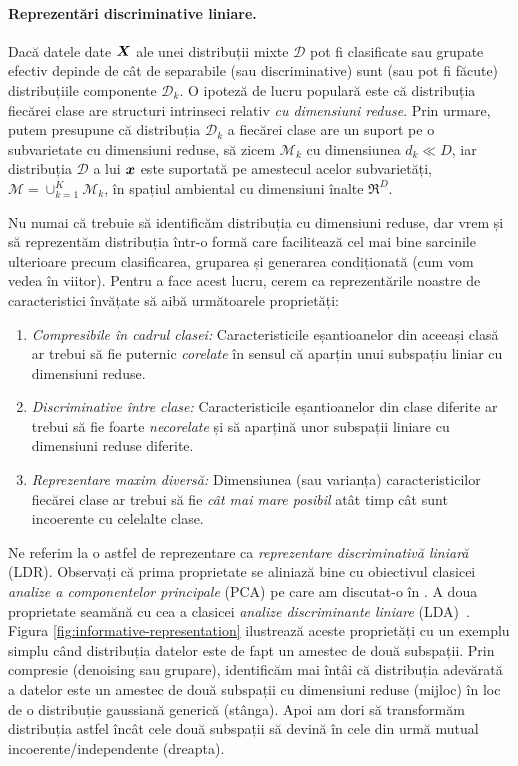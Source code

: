 \documentclass[../../book-main_ro.tex]{subfiles}
\begin{document}
\paragraph{Reprezentări discriminative liniare.}
Dacă datele date $\bm{X}$ ale unei distribuții mixte $\mathcal{D}$ pot fi clasificate sau grupate efectiv depinde de cât de separabile (sau discriminative) sunt (sau pot fi făcute) distribuțiile componente $\mathcal{D}_k$. O ipoteză de lucru populară este că distribuția fiecărei clase are structuri intrinseci relativ {\em cu dimensiuni reduse}. Prin urmare, putem presupune că distribuția $\mathcal{D}_k$ a fiecărei clase are un suport pe o subvarietate cu dimensiuni reduse, să zicem $\mathcal{M}_k$ cu dimensiunea $d_k \ll D$, iar distribuția $\mathcal D$ a lui $\bm{x}$ este suportată pe amestecul acelor subvarietăți, $\mathcal M = \cup_{k=1}^K \mathcal{M}_k$, în spațiul ambiental cu dimensiuni înalte $\Re^D$.

Nu numai că trebuie să identificăm distribuția cu dimensiuni reduse, dar vrem și să reprezentăm distribuția într-o formă care facilitează cel mai bine sarcinile ulterioare precum clasificarea, gruparea și generarea condiționată (cum vom vedea în viitor). Pentru a face acest lucru, cerem ca reprezentările noastre de caracteristici învățate să aibă următoarele proprietăți:
\begin{enumerate}
	\item {\em Compresibile în cadrul clasei:} Caracteristicile eșantioanelor din aceeași clasă ar trebui să fie puternic {\em corelate} în sensul că aparțin unui subspațiu liniar cu dimensiuni reduse.
	\item {\em Discriminative între clase:} Caracteristicile eșantioanelor din clase diferite ar trebui să fie foarte {\em necorelate} și să aparțină unor subspații liniare cu dimensiuni reduse diferite.
	\item {\em Reprezentare maxim diversă:} Dimensiunea (sau varianța) caracteristicilor fiecărei clase ar trebui să fie {\em cât mai mare posibil} atât timp cât sunt incoerente cu celelalte clase.
\end{enumerate}
Ne referim la o astfel de reprezentare ca {\em reprezentare discriminativă liniară} (LDR). Observați că prima proprietate se aliniază bine cu obiectivul clasicei {\em analize a componentelor principale} (PCA) pe care am discutat-o în . A doua proprietate seamănă cu cea a clasicei {\em analize discriminante liniare} (LDA)~\cite{HastieTiFr09}. Figura \ref{fig:informative-representation} ilustrează aceste proprietăți cu un exemplu simplu când distribuția datelor este de fapt un amestec de două subspații. Prin compresie (denoising sau grupare), identificăm mai întâi că distribuția adevărată a datelor este un amestec de două subspații cu dimensiuni reduse (mijloc) în loc de o distribuție gaussiană generică (stânga). Apoi am dori să transformăm distribuția astfel încât cele două subspații să devină în cele din urmă mutual incoerente/independente (dreapta).
\end{document}
